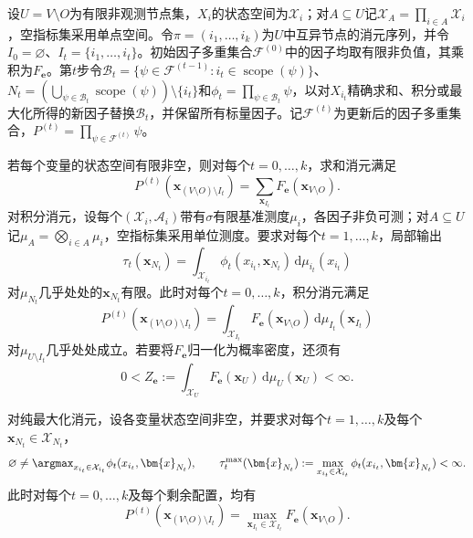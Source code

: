 \begin{theorem}[同类消元的不变式]
  \label{thm:pgm-elimination-invariant}
  设$U=V\setminus O$为有限非观测节点集，$X_i$的状态空间为$\mathcal{X}_i$；对$A\subseteq U$记$\mathcal{X}_A=\prod_{i\in A}\mathcal{X}_i$，空指标集采用单点空间。令$\pi=(i_1,\ldots,i_k)$为$U$中互异节点的消元序列，并令$I_0=\varnothing$、$I_t=\{i_1,\ldots,i_t\}$。初始因子多重集合$\mathcal{F}^{(0)}$中的因子均取有限非负值，其乘积为$F_{\bm{e}}$。第$t$步令$\mathcal{B}_t=\{\psi\in\mathcal{F}^{(t-1)}:i_t\in\operatorname{scope}(\psi)\}$、$N_t=(\bigcup_{\psi\in\mathcal{B}_t}\operatorname{scope}(\psi))\setminus\{i_t\}$和$\phi_t=\prod_{\psi\in\mathcal{B}_t}\psi$，以对$X_{i_t}$精确求和、积分或最大化所得的新因子替换$\mathcal{B}_t$，并保留所有标量因子。记$\mathcal{F}^{(t)}$为更新后的因子多重集合，$P^{(t)}=\prod_{\psi\in\mathcal{F}^{(t)}}\psi$。

  若每个变量的状态空间有限非空，则对每个$t=0,\ldots,k$，求和消元满足
  \[
    P^{(t)}(\bm{x}_{(V\setminus O)\setminus I_t})
    =\sum_{\bm{x}_{I_t}}F_{\bm{e}}(\bm{x}_{V\setminus O}).
  \]
  对积分消元，设每个$(\mathcal{X}_i,\mathcal{A}_i)$带有$\sigma$有限基准测度$\mu_i$，各因子非负可测；对$A\subseteq U$记$\mu_A=\bigotimes_{i\in A}\mu_i$，空指标集采用单位测度。要求对每个$t=1,\ldots,k$，局部输出
  \[
    \tau_t(\bm{x}_{N_t})
      =\int_{\mathcal{X}_{i_t}}
         \phi_t(x_{i_t},\bm{x}_{N_t})\,\mathrm{d}\mu_{i_t}(x_{i_t})
  \]
  对$\mu_{N_t}$几乎处处的$\bm{x}_{N_t}$有限。此时对每个$t=0,\ldots,k$，积分消元满足
  \[
    P^{(t)}(\bm{x}_{(V\setminus O)\setminus I_t})
    =\int_{\mathcal{X}_{I_t}}
       F_{\bm{e}}(\bm{x}_{V\setminus O})\,
       \mathrm{d}\mu_{I_t}(\bm{x}_{I_t})
  \]
  对$\mu_{U\setminus I_t}$几乎处处成立。若要将$F_{\bm e}$归一化为概率密度，还须有
  \[
    0<Z_{\bm e}\mathrel{:=}
      \int_{\mathcal{X}_U}F_{\bm e}(\bm{x}_U)\,
      \mathrm{d}\mu_U(\bm{x}_U)<\infty.
  \]

  对纯最大化消元，设各变量状态空间非空，并要求对每个$t=1,\ldots,k$及每个$\bm{x}_{N_t}\in\mathcal{X}_{N_t}$，
  \[
    \varnothing\neq
    \argmax_{x_{i_t}\in\mathcal{X}_{i_t}}
      \phi_t(x_{i_t},\bm{x}_{N_t}),
    \qquad
    \tau_t^{\max}(\bm{x}_{N_t})
      \mathrel{:=}\max_{x_{i_t}\in\mathcal{X}_{i_t}}
        \phi_t(x_{i_t},\bm{x}_{N_t})<\infty.
  \]
  此时对每个$t=0,\ldots,k$及每个剩余配置，均有
  \[
    P^{(t)}(\bm{x}_{(V\setminus O)\setminus I_t})
    =\max_{\bm{x}_{I_t}\in\mathcal{X}_{I_t}}
       F_{\bm{e}}(\bm{x}_{V\setminus O}).
  \]
\end{theorem}

